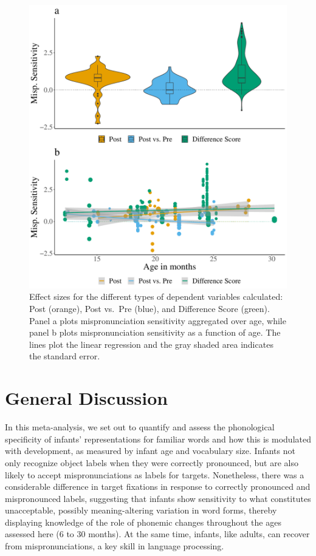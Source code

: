 \documentclass[man, noextraspace]{apa6}
\begin{document}
\begin{figure}
\centering
\includegraphics{VonHolzenBergmann_MPMetaAnalysis_files/figure-latex/PlotWithinCondAgeDiffScore-1.pdf}
\caption{\label{fig:PlotWithinCondAgeDiffScore}Effect sizes for the different types of dependent variables calculated: Post (orange), Post vs.~Pre (blue), and Difference Score (green). Panel a plots mispronunciation sensitivity aggregated over age, while panel b plots mispronunciation sensitivity as a function of age. The lines plot the linear regression and the gray shaded area indicates the standard error.}
\end{figure}

\hypertarget{general-discussion}{%
\section{General Discussion}\label{general-discussion}}

In this meta-analysis, we set out to quantify and assess the phonological specificity of infants' representations for familiar words and how this is modulated with development, as measured by infant age and vocabulary size. Infants not only recognize object labels when they were correctly pronounced, but are also likely to accept mispronunciations as labels for targets. Nonetheless, there was a considerable difference in target fixations in response to correctly pronounced and mispronounced labels, suggesting that infants show sensitivity to what constitutes unacceptable, possibly meaning-altering variation in word forms, thereby displaying knowledge of the role of phonemic changes throughout the ages assessed here (6 to 30 months). At the same time, infants, like adults, can recover from mispronunciations, a key skill in language processing.
\end{document}
